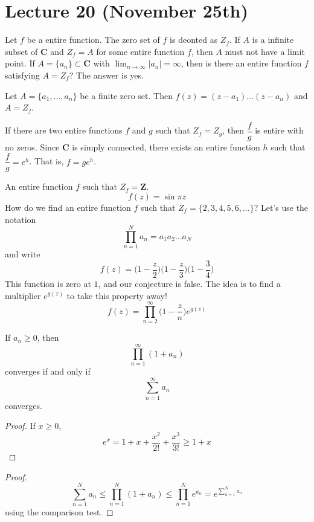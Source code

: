 \section{Lecture 20 (November 25th)}
\begin{rmk}
Let $f$ be a entire function. The zero set of $f$ is deonted as $Z_{f}$. If $A$ is a infinite subset of ${\bm C}$ and $Z_{f}=A$ for some entire function $f$, then $A$ must not have a limit point. If $A=\{a_{n}\}\subset {\bm C}$ with $\lim _{n\rightarrow \infty }|a_{n}|=\infty $, then is there an entire function $f$ satisfying $A=Z_{f}$? The answer is yes.
\end{rmk}
\vspace{2ex}
\begin{ex}
Let $A=\{a_1,\ldots ,a_{n}\}$ be a finite zero set. Then $f(z)=(z-a_1)\ldots (z-a_{n})$ and $A=Z_{f}$. 
\end{ex}
\vspace{2ex}
\begin{prop}
If there are two entire functions $f$ and $g$ such that $Z_{f}=Z_{g}$, then $\dfrac{f}{g}$ is entire with no zeros. Since ${\bm C}$ is simply connected, there exists an entire function $h$ such that $\dfrac{f}{g}=e^{h}$. That is, $f=ge^{h}$. 
\end{prop}
\vspace{2ex}
\begin{ex}
An entire function $f$ such that $Z_{f}={\bm Z}$.
\[f(z)=\sin \pi z\]
How do we find an entire function $f$ such that $Z_{f}=\{2,3,4,5,6,\ldots \}$? Let's use the notation
\[\prod^{N}_{n=1}a_{n}=a_1a_2\ldots a_{N}\]
and write
\[f(z)=\Big(1-\dfrac{z}{2}\Big)\Big(1-\dfrac{z}{3}\Big)\Big(1-\dfrac{3}{4}\Big)\]
This function is zero at $1$, and our conjecture is false. The idea is to find a multiplier $e^{g(z)}$ to take this property away!
\[f(z)=\prod^{\infty }_{n=2}\Big(1-\dfrac{z}{n}\Big)e^{g(z)}\]
\end{ex}
\vspace{2ex}
\begin{lem}
If $a_{n}\geq 0$, then 
\[\prod^{\infty }_{n=1}(1+a_{n})\]
converges if and only if 
\[\sum ^{\infty }_{n=1}a_{n}\]
converges. 
\end{lem}
\vspace{2ex}
\begin{proof}
If $x\geq 0$,
\[e^{x}=1+x+\dfrac{x^2}{2!}+\dfrac{x^3}{3!}\geq 1+x\]
\end{proof}
\vspace{2ex}
\begin{proof}
\[\sum ^{N}_{n=1}a_{n}\leq \prod^{N}_{n=1}(1+a_{n})\leq \prod^{N}_{n=1}e^{a_{n}}=e^{\sum ^{N}_{n=1}a_{n}}\]
using the comparison test. 
\end{proof}
